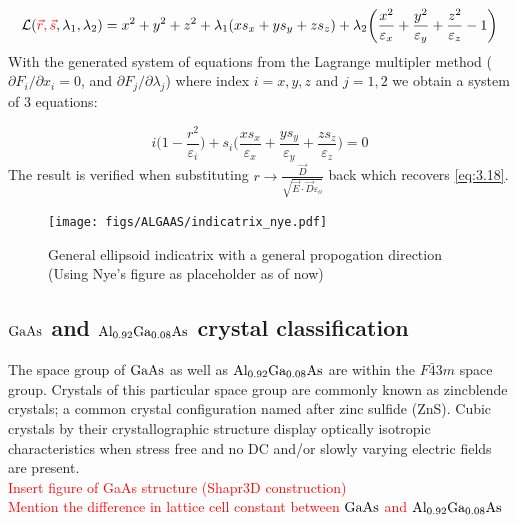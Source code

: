 \begin{equation}
\mathcal{L}(\textcolor{red}{\vec{r},\vec{s}},\lambda_1, \lambda_2) =
x^2 + y^2 + z^2 + \lambda_1 (xs_x + ys_y + zs_z) + \lambda_2 \bigg( \frac{x^2}{\varepsilon_x} + \frac{y^2}{\varepsilon_y} + \frac{z^2}{\varepsilon_z} - 1 \bigg)
\end{equation}
With the generated system of equations from the Lagrange multipler method ($\partial F_i/ \partial x_i = 0$, and $\partial F_j/ \partial \lambda_j$) where index $i =x,y,z$ and $j = 1,2$ we obtain a system of 3 equations:

\begin{equation}
i \bigg(1-\frac{r^2}{\varepsilon_{i}} \bigg) + s_{i} \bigg(\frac{x s_x}{\varepsilon_x} + \frac{y s_y}{\varepsilon_y} + \frac{z s_z}{\varepsilon_z} \bigg) = 0
\end{equation}
The result is verified when substituting $r \rightarrow \frac{\vec{D}}{\sqrt{\vec{E} \cdot \vec{D} \varepsilon_o}}$ back which recovers \ref{eq:3.18}.
\\

\begin{figure}[H]
\texttt{[image: figs/ALGAAS/indicatrix\_nye.pdf]}
\caption{General ellipsoid indicatrix with a general propogation direction (Using Nye's figure as placeholder as of now)}
\label{fig:general_indicatrix}
\end{figure}

\subsection{$\mathrm{GaAs}$ and $\mathrm{Al_{0.92}Ga_{0.08}As}$ crystal classification}
The space group of $\mathrm{GaAs}$ as well as $\mathrm{Al_{0.92}Ga_{0.08}As}$ are within the $F\bar{4}3m$ space group. Crystals of this particular space group are commonly known as zincblende crystals; a common crystal configuration named after zinc sulfide (ZnS). Cubic crystals by their crystallographic structure display optically isotropic characteristics when  stress free and no DC and/or slowly varying electric fields are present.
\\
\textcolor{red}{Insert figure of GaAs structure (Shapr3D construction)}
\\
\textcolor{red}{Mention the difference in lattice cell constant between $\mathrm{GaAs}$ and $\mathrm{Al_{0.92}Ga_{0.08}As}$}


